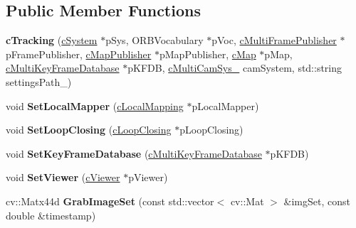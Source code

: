 \subsection*{Public Member Functions}
\begin{DoxyCompactItemize}
\item 
{\bfseries c\+Tracking} (\hyperlink{classMultiColSLAM_1_1cSystem}{c\+System} $\ast$p\+Sys, O\+R\+B\+Vocabulary $\ast$p\+Voc, \hyperlink{classMultiColSLAM_1_1cMultiFramePublisher}{c\+Multi\+Frame\+Publisher} $\ast$p\+Frame\+Publisher, \hyperlink{classMultiColSLAM_1_1cMapPublisher}{c\+Map\+Publisher} $\ast$p\+Map\+Publisher, \hyperlink{classMultiColSLAM_1_1cMap}{c\+Map} $\ast$p\+Map, \hyperlink{classMultiColSLAM_1_1cMultiKeyFrameDatabase}{c\+Multi\+Key\+Frame\+Database} $\ast$p\+K\+F\+DB, \hyperlink{classMultiColSLAM_1_1cMultiCamSys__}{c\+Multi\+Cam\+Sys\+\_\+} cam\+System, std\+::string settings\+Path\+\_\+)\hypertarget{classMultiColSLAM_1_1cTracking_acdba5cbd4cbc0c12cf323cd39b941d49}{}\label{classMultiColSLAM_1_1cTracking_acdba5cbd4cbc0c12cf323cd39b941d49}

\item 
void {\bfseries Set\+Local\+Mapper} (\hyperlink{classMultiColSLAM_1_1cLocalMapping}{c\+Local\+Mapping} $\ast$p\+Local\+Mapper)\hypertarget{classMultiColSLAM_1_1cTracking_a8a57448143c0bc20808fa5ae61c32cdf}{}\label{classMultiColSLAM_1_1cTracking_a8a57448143c0bc20808fa5ae61c32cdf}

\item 
void {\bfseries Set\+Loop\+Closing} (\hyperlink{classMultiColSLAM_1_1cLoopClosing}{c\+Loop\+Closing} $\ast$p\+Loop\+Closing)\hypertarget{classMultiColSLAM_1_1cTracking_a69b3621570bc04268c76eff4168d80bd}{}\label{classMultiColSLAM_1_1cTracking_a69b3621570bc04268c76eff4168d80bd}

\item 
void {\bfseries Set\+Key\+Frame\+Database} (\hyperlink{classMultiColSLAM_1_1cMultiKeyFrameDatabase}{c\+Multi\+Key\+Frame\+Database} $\ast$p\+K\+F\+DB)\hypertarget{classMultiColSLAM_1_1cTracking_a577332161e4379bf97a117a1147e2e4e}{}\label{classMultiColSLAM_1_1cTracking_a577332161e4379bf97a117a1147e2e4e}

\item 
void {\bfseries Set\+Viewer} (\hyperlink{classMultiColSLAM_1_1cViewer}{c\+Viewer} $\ast$p\+Viewer)\hypertarget{classMultiColSLAM_1_1cTracking_a1a5c06c53cb38037a1e0cf037c2d3530}{}\label{classMultiColSLAM_1_1cTracking_a1a5c06c53cb38037a1e0cf037c2d3530}

\item 
cv\+::\+Matx44d {\bfseries Grab\+Image\+Set} (const std\+::vector$<$ cv\+::\+Mat $>$ \&img\+Set, const double \&timestamp)\hypertarget{classMultiColSLAM_1_1cTracking_af0e2d0648e87a8aa3fbacb79bce768c7}{}\label{classMultiColSLAM_1_1cTracking_af0e2d0648e87a8aa3fbacb79bce768c7}


\end{DoxyCompactItemize}
